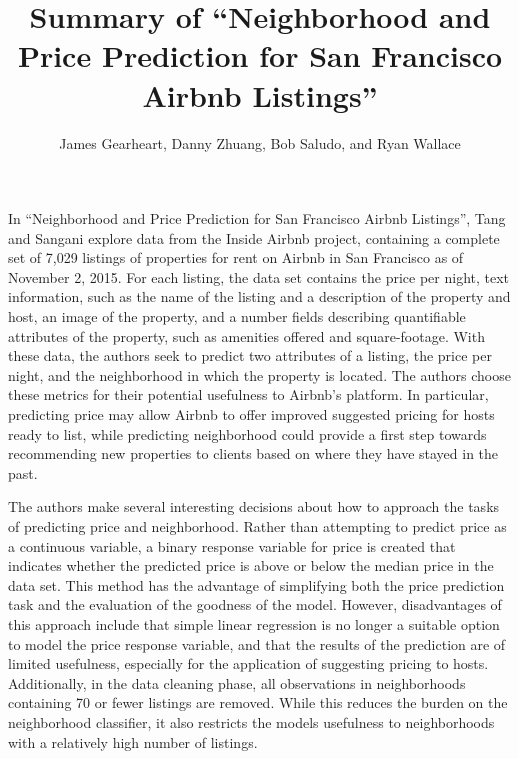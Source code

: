 \documentclass{article}
\begin{document}
\title{Summary of ``Neighborhood and Price Prediction for San Francisco Airbnb Listings''}

\author{James Gearheart, Danny Zhuang, Bob Saludo, and Ryan Wallace}

\maketitle

In ``Neighborhood and Price Prediction for San Francisco Airbnb Listings'', Tang and Sangani explore data from the Inside Airbnb project, containing a complete set of 7,029 listings of properties for rent on Airbnb in San Francisco as of November 2, 2015. For each listing, the data set contains the price per night, text information, such as the name of the listing and a description of the property and host, an image of the property, and a number fields describing quantifiable attributes of the property, such as amenities offered and square-footage. With these data, the authors seek to predict two attributes of a listing, the price per night, and the neighborhood in which the property is located. The authors choose these metrics for their potential usefulness to Airbnb's platform. In particular, predicting price may allow Airbnb to offer improved suggested pricing for hosts ready to list, while predicting neighborhood could provide a first step towards recommending new properties to clients based on where they have stayed in the past.

The authors make several interesting decisions about how to approach the tasks of predicting price and neighborhood. Rather than attempting to predict price as a continuous variable, a binary response variable for price is created that indicates whether the predicted price is above or below the median price in the data set. This method has the advantage of simplifying both the price prediction task and the evaluation of the goodness of the model. However, disadvantages of this approach include that simple linear regression is no longer a suitable option to model the price response variable, and that the results of the prediction are of limited usefulness, especially for the application of suggesting pricing to hosts. Additionally, in the data cleaning phase, all observations in neighborhoods containing 70 or fewer listings are removed. While this reduces the burden on the neighborhood classifier, it also restricts the models usefulness to neighborhoods with a relatively high number of listings. 
\end{document}
